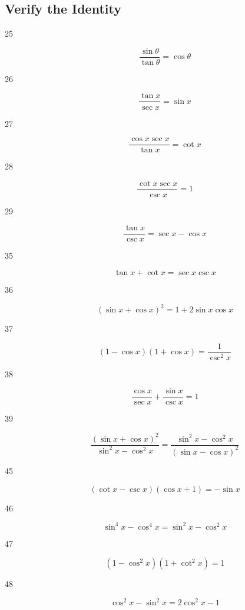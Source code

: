 \documentclass{exam}
\begin{document}
  \subsection{Verify the Identity}
  \begin{description}

    \item[25]
      \[
        \frac{\sin \theta}{\tan \theta} = \cos \theta
      \]

    \item[26]
      \[
        \frac{\tan x}{\sec x} = \sin x
      \]

    \item[27]
      \[
        \frac{\cos x \sec x}{\tan x} = \cot x
      \]

    \item[28]
      \[
        \frac{\cot x \sec x}{\csc x} = 1
      \]

    \item[29]
      \[
        \frac{\tan x}{\csc x} = \sec x - \cos x
      \]

    \item[35]
      \[
        \tan x + \cot x = \sec x \csc x
      \]

    \item[36]
      \[
        (\sin x + \cos x)^2 = 1 + 2 \sin x \cos x
      \]

    \item[37]
      \[
        (1 - \cos x)(1 + \cos x) = \frac{1}{\csc^2 x}
      \]

    \item[38]
      \[
        \frac{\cos x}{\sec x} + \frac{\sin x}{\csc x} = 1
      \]

    \item[39]
      \[
        \frac{(\sin x + \cos x)^2}{\sin^2 x - \cos^2 x} = \frac{\sin^2 x - \cos^2 x}{(\sin x - \cos x)^2}
      \]

    \item[45]
      \[
        (\cot x - \csc x)(\cos x + 1) = - \sin x
      \]

    \item[46]
      \[
        \sin^4 x - \cos^4 x = \sin^2 x - \cos^2 x
      \]

    \item[47]
      \[
        \left( 1 - \cos^2 x \right)\left( 1 + \cot^2 x \right) = 1
      \]

    \item[48]
      \[
        \cos^2 x - \sin^2 x = 2 \cos^2 x - 1
      \]


\end{description}
\end{document}
